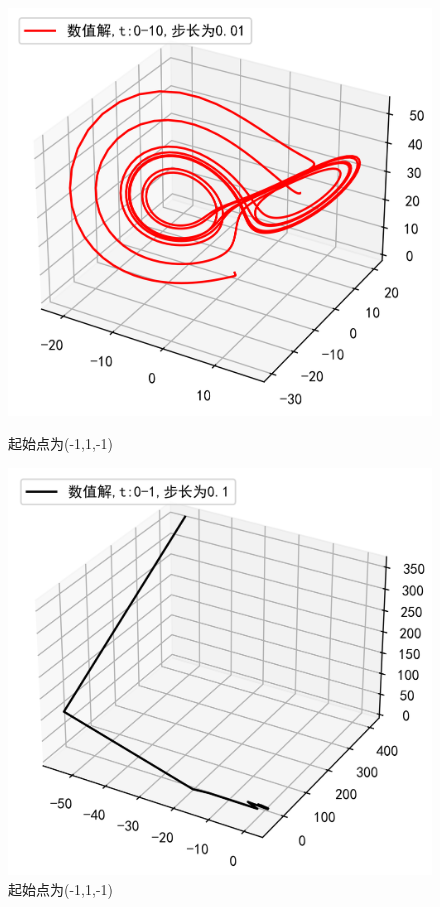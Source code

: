 \documentclass[a4paper]{article}%
\begin{document}
\begin{figure}[h]
    \begin{minipage}[h]{0.48\linewidth}
    \centering
    \includegraphics[scale=0.65]{63}
    \caption{起始点为(-1,1,-1)}
    \end{minipage}
    \begin{minipage}[h]{0.48\linewidth}
    \centering
    \includegraphics[scale=0.65]{64}
    \caption{起始点为(-1,1,-1)}
    \end{minipage}
\end{figure}
\end{document}

